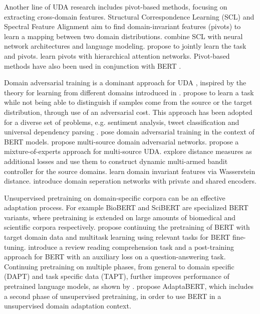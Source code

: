 \documentclass[11pt]{article}
\begin{document}
Another line of UDA research includes pivot-based methods, focusing on extracting cross-domain features. Structural Correspondence Learning (SCL) \citep{blitzer-etal-2006-domain} and Spectral Feature Alignment \citep{pan2010cross} aim to find domain-invariant features (pivots) to learn a mapping between two domain distributions. \citet{ziser-reichart-2017-neural, ziser-reichart-2018-pivot, ziser-reichart-2019-task} combine SCL with neural network architectures and language modeling. \citet{miller-2019-simplified} propose to jointly learn the task and pivots. \citet{li2018hierarchical} learn pivots with hierarchical attention networks. Pivot-based methods have also been used in conjunction with BERT \citep{ben2020perl}.

Domain adversarial training is a dominant approach for UDA \citep{ramponi-and-plank-2020-neural}, inspired by the theory for learning from different domains introduced in \citet{ben2007analysis, ben2010theory}. \citet{ganin2016domain, ganinlempitsky2015} propose to learn a task while not being able to distinguish if samples come from the source or the target distribution, through use of an adversarial cost. This approach has been adopted for a diverse set of problems, e.g. sentiment analysis, tweet classification and universal dependency parsing \citep{li-etal-2018-whats, alam-etal-2018-domain, sato-etal-2017-adversarial}.  \citet{du-etal-2020-adversarial} pose domain adversarial training in the context of BERT models.  \citet{zhao2018adversarial} propose multi-source domain adversarial networks. \citet{guo-etal-2018-multi} propose a mixture-of-experts approach for multi-source UDA. \citet{guo2020multi} explore distance measures as additional losses and use them to construct dynamic multi-armed bandit controller for the source domains. \citet{shen2017wasserstein} learn domain invariant features via Wasserstein distance.  \citet{bousmalis2016domain} introduce domain seperation networks with private and shared encoders. 

Unsupervised pretraining on domain-specific corpora can be an effective adaptation process.
For example BioBERT \citep{lee2020biobert} and SciBERT \citep{beltagy-etal-2019-scibert} are specialized BERT variants, where pretraining is extended on large amounts of biomedical and scientific corpora respectively. \citet{sun2019fine} propose continuing the pretraining of BERT with target domain data and multitask learning using relevant tasks for BERT fine-tuning. \citet{xu-etal-2019-bert} introduce a review reading comprehension task and a post-training approach for BERT with an auxiliary loss on a question-answering task. Continuing pretraining on multiple phases, from general to domain specific (DAPT) and task specific data (TAPT), further improves performance of pretrained language models, as shown by \citet{gururangan-etal-2020-dont}. \citet{han-eisenstein-2019-unsupervised} propose AdaptaBERT, which includes a second phase of unsupervised pretraining, in order to use BERT in a unsupervised domain adaptation context.
\end{document}
